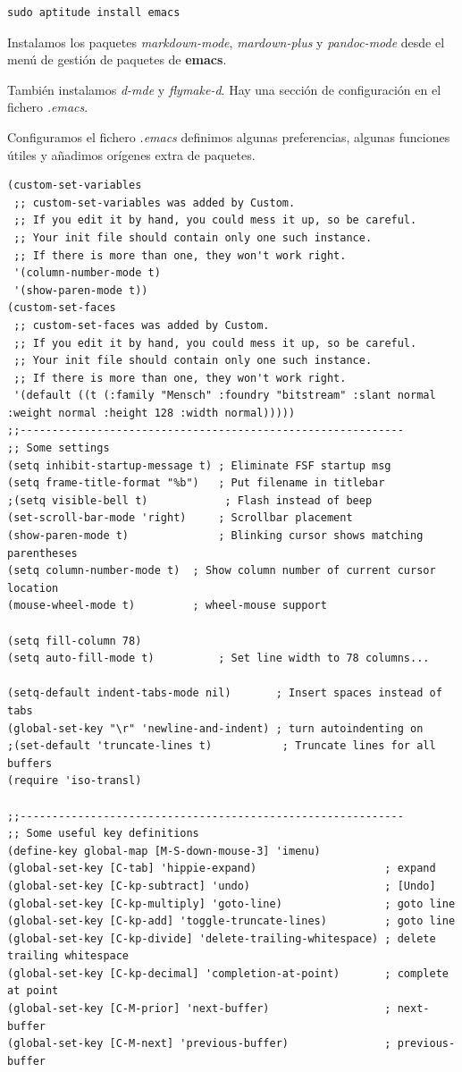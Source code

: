 \documentclass[12pt,spanish,]{article}
\begin{document}
\begin{verbatim}
sudo aptitude install emacs
\end{verbatim}

Instalamos los paquetes \emph{markdown-mode}, \emph{mardown-plus} y
\emph{pandoc-mode} desde el menú de gestión de paquetes de
\textbf{emacs}.

También instalamos \emph{d-mde} y \emph{flymake-d}. Hay una sección de
configuración en el fichero \emph{.emacs}.

Configuramos el fichero \emph{.emacs} definimos algunas preferencias,
algunas funciones útiles y añadimos orígenes extra de paquetes.

\begin{verbatim}
(custom-set-variables
 ;; custom-set-variables was added by Custom.
 ;; If you edit it by hand, you could mess it up, so be careful.
 ;; Your init file should contain only one such instance.
 ;; If there is more than one, they won't work right.
 '(column-number-mode t)
 '(show-paren-mode t))
(custom-set-faces
 ;; custom-set-faces was added by Custom.
 ;; If you edit it by hand, you could mess it up, so be careful.
 ;; Your init file should contain only one such instance.
 ;; If there is more than one, they won't work right.
 '(default ((t (:family "Mensch" :foundry "bitstream" :slant normal :weight normal :height 128 :width normal)))))
;;------------------------------------------------------------
;; Some settings
(setq inhibit-startup-message t) ; Eliminate FSF startup msg
(setq frame-title-format "%b")   ; Put filename in titlebar
;(setq visible-bell t)            ; Flash instead of beep
(set-scroll-bar-mode 'right)     ; Scrollbar placement
(show-paren-mode t)              ; Blinking cursor shows matching parentheses
(setq column-number-mode t)  ; Show column number of current cursor location
(mouse-wheel-mode t)         ; wheel-mouse support

(setq fill-column 78)
(setq auto-fill-mode t)          ; Set line width to 78 columns...

(setq-default indent-tabs-mode nil)       ; Insert spaces instead of tabs
(global-set-key "\r" 'newline-and-indent) ; turn autoindenting on
;(set-default 'truncate-lines t)           ; Truncate lines for all buffers
(require 'iso-transl)

;;------------------------------------------------------------
;; Some useful key definitions
(define-key global-map [M-S-down-mouse-3] 'imenu)
(global-set-key [C-tab] 'hippie-expand)                    ; expand
(global-set-key [C-kp-subtract] 'undo)                     ; [Undo]
(global-set-key [C-kp-multiply] 'goto-line)                ; goto line
(global-set-key [C-kp-add] 'toggle-truncate-lines)         ; goto line
(global-set-key [C-kp-divide] 'delete-trailing-whitespace) ; delete trailing whitespace
(global-set-key [C-kp-decimal] 'completion-at-point)       ; complete at point
(global-set-key [C-M-prior] 'next-buffer)                  ; next-buffer
(global-set-key [C-M-next] 'previous-buffer)               ; previous-buffer


\end{verbatim}
\end{document}
